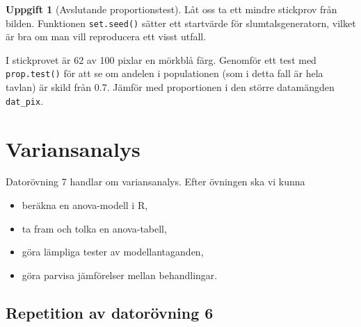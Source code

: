 \documentclass[
]{book}
\newenvironment{Shaded}{\begin{snugshade}}{\end{snugshade}}
\newcommand{\AttributeTok}[1]{\textcolor[rgb]{0.13,0.29,0.53}{#1}}
\newcommand{\DecValTok}[1]{\textcolor[rgb]{0.00,0.00,0.81}{#1}}
\newcommand{\FunctionTok}[1]{\textcolor[rgb]{0.13,0.29,0.53}{\textbf{#1}}}
\newcommand{\NormalTok}[1]{#1}
\newcommand{\OtherTok}[1]{\textcolor[rgb]{0.56,0.35,0.01}{#1}}
\newcommand{\SpecialCharTok}[1]{\textcolor[rgb]{0.81,0.36,0.00}{\textbf{#1}}}
\theoremstyle{definition}
\theoremstyle{definition}
\theoremstyle{definition}
\newtheorem{exercise}{Uppgift}[chapter]
\theoremstyle{definition}
\theoremstyle{remark}
\begin{document}
\begin{exercise}[Avslutande proportionstest]
Låt oss ta ett mindre stickprov från bilden. Funktionen \texttt{set.seed()} sätter ett startvärde för slumtalsgeneratorn, vilket är bra om man vill reproducera ett visst utfall.

\begin{Shaded}
\end{Shaded}

I stickprovet är 62 av 100 pixlar en mörkblå färg. Genomför ett test med \texttt{prop.test()} för att se om andelen i populationen (som i detta fall är hela tavlan) är skild från 0.7. Jämför med proportionen i den större datamängden \texttt{dat\_pix}.
\end{exercise}

\hypertarget{variansanalys}{%
\chapter{Variansanalys}\label{variansanalys}}

Datorövning 7 handlar om variansanalys. Efter övningen ska vi kunna

\begin{itemize}
\item
  beräkna en anova-modell i R,
\item
  ta fram och tolka en anova-tabell,
\item
  göra lämpliga tester av modellantaganden,
\item
  göra parvisa jämförelser mellan behandlingar.
\end{itemize}

\hypertarget{repetition-av-datoruxf6vning-6}{%
\section{Repetition av datorövning 6}\label{repetition-av-datoruxf6vning-6}}
\end{document}

